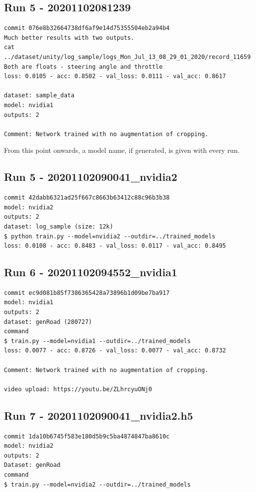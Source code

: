 \subsection{Run 5 - 20201102081239} 

\begin{verbatim}
commit 076e8b32664738df6af9e14d75355504eb2a94b4
Much better results with two outputs. 
cat ../dataset/unity/log_sample/logs_Mon_Jul_13_08_29_01_2020/record_11659.json
Both are floats - steering angle and throttle
loss: 0.0105 - acc: 0.8502 - val_loss: 0.0111 - val_acc: 0.8617

dataset: sample_data
model: nvidia1
outputs: 2

Comment: Network trained with no augmentation of cropping.

\end{verbatim}

From this point onwards, a model name, if generated, is given with every run.

\subsection{Run 5 - 20201102090041\_nvidia2}
\begin{verbatim}
commit 42dabb6321ad25f667c8663b63412c88c96b3b38
model: nvidia2
outputs: 2
dataset: log_sample (size: 12k)
$ python train.py --model=nvidia2 --outdir=../trained_models
loss: 0.0108 - acc: 0.8483 - val_loss: 0.0117 - val_acc: 0.8495
\end{verbatim}

\subsection{Run 6 - 20201102094552\_nvidia1}
\begin{verbatim}
commit ec9d081b85f7386365428a73896b1d09be7ba917
model: nvidia1
outputs: 2
dataset: genRoad (280727)
command
$ train.py --model=nvidia1 --outdir=../trained_models
loss: 0.0077 - acc: 0.8726 - val_loss: 0.0077 - val_acc: 0.8732

Comment: Network trained with no augmentation of cropping.

video upload: https://youtu.be/ZLhrcyuONj0
\end{verbatim}

\subsection{Run 7 - 20201102090041\_nvidia2.h5}
\begin{verbatim}
commit 1da10b6745f583e180d5b9c5ba4874847ba8610c
model: nvidia2
outputs: 2
Dataset: genRoad
command
$ train.py --model=nvidia2 --outdir=../trained_models
\end{verbatim}

